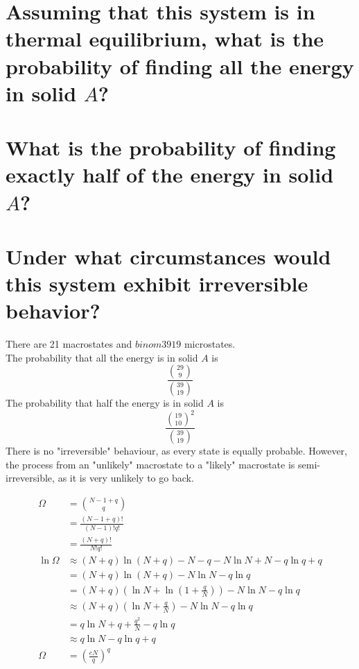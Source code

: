 \documentclass[answers]{exam}
\begin{document}
\begin{questions}
\begin{parts}
    \part{Assuming that this system is in thermal equilibrium, what is the probability of finding all the energy in solid $A$?}
    \part{What is the probability of finding exactly half of the energy in solid $A$?}
    \part{Under what circumstances would this system exhibit irreversible behavior?}
\end{parts}

\begin{solution}
    There are 21 macrostates and $binom{39}{19}$ microstates. \\
    The probability that all the energy is in solid $A$ is
    $$\frac{\binom{29}{9}}{\binom{39}{19}}$$
    The probability that half the energy is in solid $A$ is
    $$\frac{\binom{19}{10}^2}{\binom{39}{19}}$$
    There is no "irreversible" behaviour, as every state is equally probable. However, the process from an "unlikely" macrostate to a "likely" macrostate is semi-irreversible, as it is very unlikely to go back.
\end{solution}


\begin{solution}
    \begin{align*}
        \Omega &= \binom{N-1+q}{q} \\
               &= \frac{(N-1+q)!}{(N-1)!q!} \\
               &= \frac{(N+q)!}{N!q!} \\
        \ln\Omega &\approx (N+q)\ln(N+q) - N - q - N\ln N + N - q\ln q + q \\
                  &= (N+q)\ln(N+q) - N\ln N - q\ln q \\
                  &= (N+q)\left(\ln N + \ln\left(1+\frac{q}{N}\right)\right) - N\ln N - q\ln q \\
                  &\approx (N+q)(\ln N + \frac{q}{N}) - N\ln N - q\ln q \\
                  &= q\ln N + q + \frac{q^2}{N} - q\ln q \\
                  &\approx q\ln N - q\ln q + q \\
        \Omega &= \left(\frac{eN}{q}\right)^q
    \end{align*}
\end{solution}


\end{questions}
\end{document}
